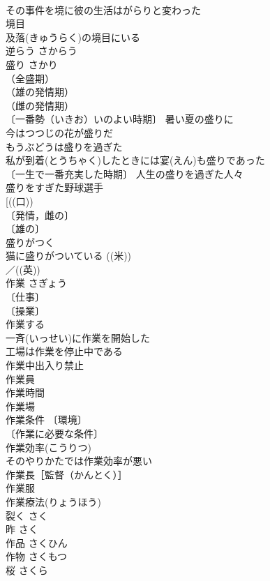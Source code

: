 \documentclass[8pt]{extreport}
\begin{document}
\begin{CJK}{UTF8}{min}
\\	その事件を境に彼の生活はがらりと変わった 
\\	境目　
\\	及落(きゅうらく)の境目にいる 
\\	逆らう	さからう	
\\	盛り	さかり	
\\	（全盛期）
\\	（雄の発情期）
\\	（雌の発情期）
\\	〔一番勢（いきお）いのよい時期〕 暑い夏の盛りに 
\\	今はつつじの花が盛りだ 
\\	もうぶどうは盛りを過ぎた 
\\	私が到着(とうちゃく)したときには宴(えん)も盛りであった 
\\	〔一生で一番充実した時期〕 人生の盛りを過ぎた人々 
\\	盛りをすぎた野球選手 
\\	[((口)) 
\\	〔発情，雌の〕
\\	〔雄の〕
\\	盛りがつく 
\\	猫に盛りがついている ((米)) 
\\	／((英)) 
\\	作業	さぎょう	
\\	〔仕事〕
\\	〔操業〕
\\	作業する 
\\	一斉(いっせい)に作業を開始した 
\\	工場は作業を停止中である 
\\	作業中出入り禁止 
\\	作業員 
\\	作業時間 
\\	作業場 
\\	作業条件 〔環境〕
\\	〔作業に必要な条件〕
\\	作業効率(こうりつ) 
\\	そのやりかたでは作業効率が悪い 
\\	作業長［監督（かんとく）］ 
\\	作業服 
\\	作業療法(りょうほう) 
\\	裂く	さく	
\\	昨	さく	
\\	作品	さくひん	
\\	作物	さくもつ	
\\	桜	さくら	

\end{CJK}
\end{document}
